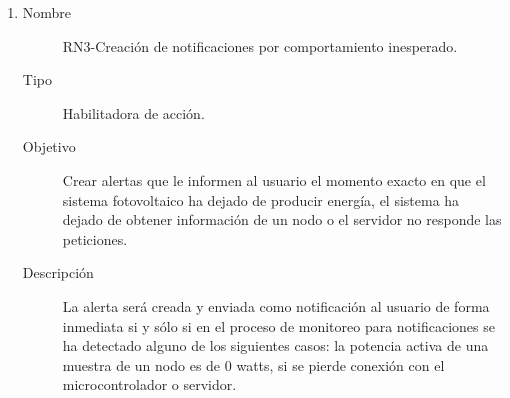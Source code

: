 \begin{enumerate}[label=RN\arabic*.]
    \item \label{RN3}
		\begin{description}
			\item[Nombre] RN3-Creación de notificaciones por comportamiento inesperado.
			\item[Tipo] Habilitadora de acción.
			\item[Objetivo] Crear alertas que le informen al usuario el momento exacto en que el sistema fotovoltaico ha dejado de producir energía, el sistema ha dejado de obtener información de un nodo o el servidor no responde las peticiones.
			\item[Descripción] La alerta será creada y enviada como notificación al usuario de forma inmediata si y sólo si en el proceso de monitoreo para notificaciones se ha detectado alguno de los siguientes casos: la potencia activa de una muestra de un nodo es de 0 watts, si se pierde conexión con el microcontrolador o servidor.  
    		\end{description}
    		

\end{enumerate}
